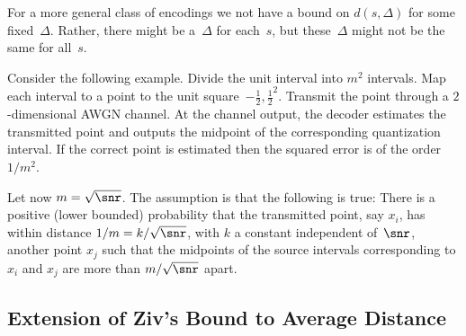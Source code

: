 For a more general class of encodings we not have a bound on $d(s,\Delta)$ for
some fixed~$\Delta$. Rather, there might be a~$\Delta$ for each~$s$, but
these~$\Delta$ might not be the same for all~$s$.

Consider the following example. Divide the unit interval into $m^2$ intervals.
Map each interval to a point to the unit square~${-\frac12, \frac12}^2$.
Transmit the point through a $2$-dimensional AWGN channel. At the channel
output, the decoder estimates the transmitted point and outputs the midpoint of
the corresponding quantization interval. If the correct point is estimated then
the squared error is of the order $1/m^2$. 

Let now $m = \sqrt{\snr}$. The assumption is that the following is true: There
is a positive (lower bounded) probability that the transmitted point, say $x_i$,
has within distance $1/m = k/\sqrt{\snr}$, with $k$ a constant independent
of~$\snr$, another point $x_j$ such that the midpoints of the source intervals
corresponding to $x_i$ and $x_j$ are more than $m/\sqrt{\snr}$ apart.

\subsection{Extension of Ziv's Bound to Average Distance}


